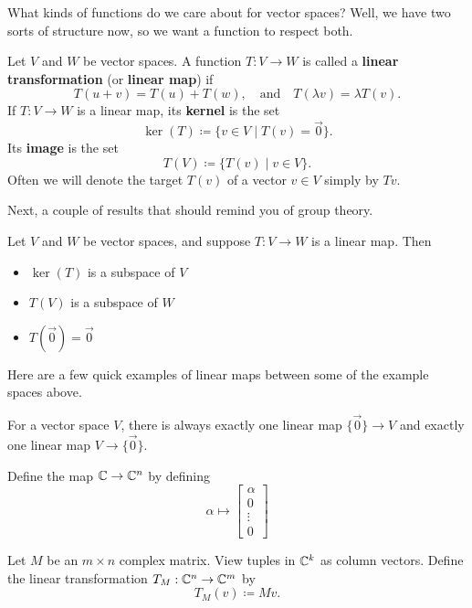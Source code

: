 What kinds of functions do we care about for vector spaces?
Well, we have two sorts of structure now, so we want a function to respect both.

\begin{definition}
    Let $V$ and $W$ be vector spaces.
    A function $T:V\to W$ is called a {\bf linear transformation} (or {\bf linear map}) if
    \[
        T(u+v) = T(u) + T(w), \quad \text{and} \quad T(\lambda v) = \lambda T(v).
    \]
    If $T:V\to W$ is a linear map, its {\bf kernel} is the set
    \[
        \ker(T) \coloneq \{v\in V \mid T(v)=\vec{0}\}.
    \]
    Its {\bf image} is the set
    \[
        T(V) \coloneq \{ T(v) \mid v\in V\}.
    \]
    Often we will denote the target $T(v)$ of a vector $v\in V$ simply by $Tv$.
\end{definition}

Next, a couple of results that should remind you of group theory.

\begin{proposition}
    Let $V$ and $W$ be vector spaces, and suppose $T:V\to W$ is a linear map.
    Then
    \begin{itemize}
        \item $\ker(T)$ is a subspace of $V$
        \item $T(V)$ is a subspace of $W$
        \item $T(\vec{0}) = \vec{0}$
    \end{itemize}
\end{proposition}

Here are a few quick examples of linear maps between some of the example spaces above.

\begin{example}[Trivial]
    For a vector space $V$, there is always exactly one linear map $\{\vec{0}\} \to V$ and 
    exactly one linear map $V \to \{\vec{0}\}$.
\end{example}

\begin{example}[Embedding]
    Define the map $\mathbb{C} \to \mathbb{C}^n$ by defining
    \[
        \alpha \mapsto \begin{bmatrix}
            \alpha \\
            0 \\ \vdots \\ 0
        \end{bmatrix}
    \]
\end{example}

\begin{example}[Matrix]
    Let $M$ be an $m\times n$ complex matrix.
    View tuples in $\mathbb{C}^k$ as column vectors.
    Define the linear transformation $T_M:\mathbb{C}^n \to \mathbb{C}^m$ by
    \[
        T_M(v) \coloneq Mv.
    \]
\end{example}

